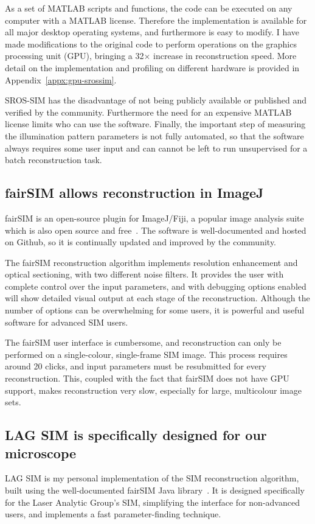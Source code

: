 As a set of MATLAB scripts and functions, the code can be executed on any computer with a MATLAB license.
Therefore the implementation is available for all major desktop operating systems, and furthermore is easy to modify.
I have made modifications to the original code to perform operations on the graphics processing unit (GPU), bringing a 32$\times$ increase in reconstruction speed.
More detail on the implementation and profiling on different hardware is provided in Appendix~\ref{appx:gpu-srossim}. 

SROS-SIM has the disadvantage of not being publicly available or published and verified by the community.
Furthermore the need for an expensive MATLAB license limits who can use the software.
Finally, the important step of measuring the illumination pattern parameters is not fully automated, so that the software always requires some user input and can cannot be left to run unsupervised for a batch reconstruction task.

\subsection{fairSIM allows reconstruction in ImageJ}
fairSIM is an open-source plugin for ImageJ/Fiji, a popular image analysis suite which is also open source and free~\cite{muller2016open, schindelin2012fiji}.
The software is well-documented and hosted on Github, so it is continually updated and improved by the community.

The fairSIM reconstruction algorithm implements resolution enhancement and optical sectioning, with two different noise filters.
It provides the user with complete control over the input parameters, and with debugging options enabled will show detailed visual output at each stage of the reconstruction.
Although the number of options can be overwhelming for some users, it is powerful and useful software for advanced SIM users.

The fairSIM user interface is cumbersome, and reconstruction can only be performed on a single-colour, single-frame SIM image.
This process requires around 20 clicks, and input parameters must be resubmitted for every reconstruction.
This, coupled with the fact that fairSIM does not have GPU support, makes reconstruction very slow, especially for large, multicolour image sets.

\subsection{LAG SIM is specifically designed for our microscope}
LAG SIM is my personal implementation of the SIM reconstruction algorithm, built using the well-documented fairSIM Java library~\cite{fairsimGithub}.
It is designed specifically for the Laser Analytic Group's SIM, simplifying the interface for non-advanced users, and implements a fast parameter-finding technique.

